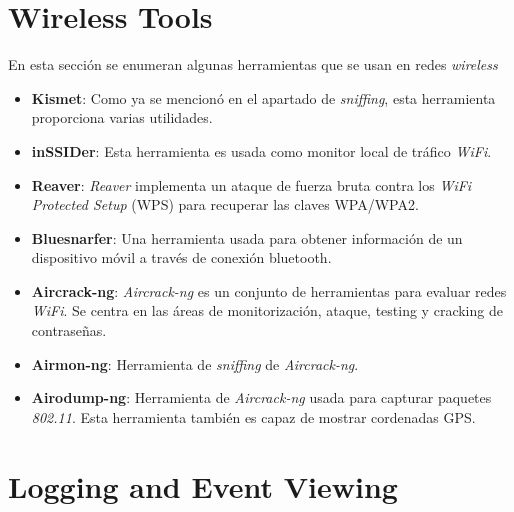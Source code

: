 \documentclass[bibliography=totocnumbered]{scrartcl}
\begin{document}
\newpage
\section{Wireless Tools}
En esta sección se enumeran algunas herramientas que se usan en redes \textit{wireless}
\begin{itemize}
    \item \textbf{Kismet}\parencite{kismet}: Como ya se mencionó en el apartado de \textit{sniffing}, esta herramienta proporciona varias utilidades.
    \item \textbf{inSSIDer}\parencite{inssider}: Esta herramienta es usada como monitor local de tráfico \textit{WiFi}.
    \item \textbf{Reaver}\parencite{reaver}: \textit{Reaver} implementa un ataque de fuerza bruta contra los \textit{WiFi Protected Setup} (WPS) para recuperar las claves WPA/WPA2.
    \item \textbf{Bluesnarfer}\parencite{bluesnarfer}: Una herramienta usada para obtener información de un dispositivo móvil a través de conexión bluetooth.
    \item \textbf{Aircrack-ng}\parencite{aircrack}: \textit{Aircrack-ng} es un conjunto de herramientas para evaluar redes \textit{WiFi}. Se centra en las áreas de monitorización, ataque, testing y cracking de contraseñas.
    \item \textbf{Airmon-ng}\parencite{airmon}: Herramienta de \textit{sniffing} de \textit{Aircrack-ng}\parencite{aircrack}.
    \item \textbf{Airodump-ng}\parencite{airodump}: Herramienta de \textit{Aircrack-ng}\parencite{aircrack} usada para capturar paquetes \textit{802.11}. Esta herramienta también es capaz de mostrar cordenadas GPS.
\end{itemize}

\newpage
\section{Logging and Event Viewing}


\newpage
\nocite{*}
\printbibliography 
\end{document}
